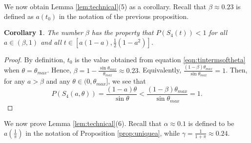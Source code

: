 \documentclass[leqno]{article}
\numberwithin{equation}{section}
\theoremstyle{definition}
\theoremstyle{remark}
\theoremstyle{plain}
\newtheorem{corollary}[equation]{Corollary}
\newtheorem{proposition}[equation]{Proposition}
\begin{document}
We now obtain Lemma \ref{lem:technical}(5) as a corollary.  Recall that $\beta\approx 0.23$ is defined as $a(t_0)$ in the notation of the previous proposition.


\begin{corollary}The number $\beta$ has the property that $P(S_4(t)) < 1$ for all $a \in (\beta,1)$ and all $t\in \left[a(1-a), \frac{1}{2}(1-a^2)\right]$.
\end{corollary}

\begin{proof}
By definition, $t_0$ is the value obtained from equation \eqref{eqn:tintermsoftheta} when $\theta = \theta_{max}$. Hence, $\beta  =  1-\frac{\sin \theta_{max}}{\theta_{max}}\approx 0.23$. Equivalently, $\frac{(1-\beta)\theta_{max}}{\sin\theta_{max}} = 1$.  Then, for any $a > \beta$ and any $\theta \in (0,\theta_{max}]$, we see that $$P(S_4(a,\theta)) = \frac{(1-a)\theta}{\sin \theta} < \frac{(1-\beta)\theta_{max}}{\sin\theta_{max}} = 1.$$
\end{proof}

We now prove Lemma \ref{lem:technical}(6).  Recall that $\alpha\approx 0.1$ is defined to be $a(\tfrac{1}{\pi})$ in the notation of Proposition \ref{prop:uniquea}, while $\gamma = \frac{1}{1+\pi}\approx 0.24$.
\end{document}
